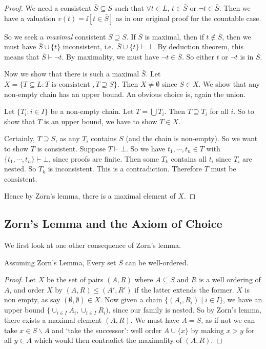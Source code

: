 \documentclass[a3paper, 10pt]{article}
\begin{document}
\begin{multicols*}{5}
\begin{proof}
  We need a consistent $\bar S \subseteq S$ such that $\forall t\in L$, $t\in \bar S$ or $\neg t\in \bar S$. Then we have a valuation $v(t) = \ii[t \in \bar S]$ as in our original proof for the countable case.

  So we seek a \emph{maximal} consistent $\bar S\supseteq S$. If $\bar S$ is maximal, then if $t\not\in \bar S$, then we must have $\bar S \cup \{t\}$ inconsistent, i.e.\ $\bar S \cup \{t\}\vdash \bot$. By deduction theorem, this means that $\bar S \vdash \neg t$. By maximality, we must have $\neg t \in \bar S$. So either $t$ or $\neg t$ is in $\bar S$.

  Now we show that there is such a maximal $\bar S$. Let $X = \{ T\subseteq L: T\text{ is consistent }, T\supseteq S\}$. Then $X\not=\emptyset$ since $S\in X$. We show that any non-empty chain has an upper bound. An obvious choice is, again the union.

  Let $\{T_i: i\in I\}$ be a non-empty chain. Let $T = \bigcup T_i$. Then $T\supseteq T_i$ for all $i$. So to show that $T$ is an upper bound, we have to show $T\in X$.

  Certainly, $T\supseteq S$, as any $T_i$ contains $S$ (and the chain is non-empty). So we want to show $T$ is consistent. Suppose $T\vdash \bot$. So we have $t_1, \cdots, t_n \in T$ with $\{t_1, \cdots, t_n\} \vdash \bot$, since proofs are finite. Then some $T_k$ contains all $t_i$ since $T_i$ are nested. So $T_k$ is inconsistent. This is a contradiction. Therefore $T$ must be consistent.

  Hence by Zorn's lemma, there is a maximal element of $X$.
\end{proof}

\subsection{Zorn's Lemma and the Axiom of Choice}

We first look at one other consequence of Zorn's lemma.

\begin{theorem}
  Assuming Zorn's Lemma, Every set $S$ can be well-ordered.
\end{theorem}
\begin{proof}
  Let $X$ be the set of pairs $(A, R)$ where $A \subseteq S$ and $R$ is a well ordering of $A$, and order $X$ by $(A, R) \leq (A', R')$ if the latter extends the former. $X$ is non empty, as say $(\emptyset, \emptyset) \in X$. Now given a chain $\{(A_i, R_i) \mid i \in I\}$, we have an upper bound $\{\cup_{i \in I} A_i, \cup_{i \in I} R_i)$, since our family is nested.
So by Zorn's lemma, there exists a maximal element $(A, R)$. We must have $A = S$, as if not we can take $x \in S \backslash A$ and `take the successor': well order $A \cup \{x\}$ by making $x > y$ for all $y \in A$ which would then contradict the maximality of $(A, R)$.
\end{proof}


\end{multicols*}
\end{document}

